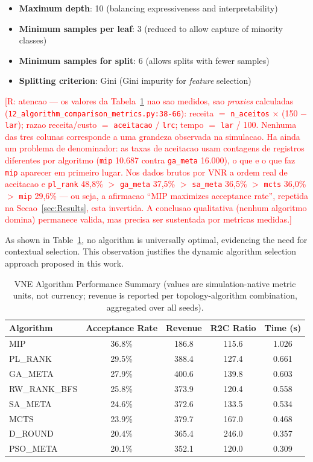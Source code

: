 \documentclass[runningheads]{llncs}
\begin{document}
\begin{itemize}
    \item \textbf{Maximum depth}: 10 (balancing expressiveness and interpretability)
    \item \textbf{Minimum samples per leaf}: 3 (reduced to allow capture of minority classes)
    \item \textbf{Minimum samples for split}: 6 (allows splits with fewer samples)
    \item \textbf{Splitting criterion}: Gini (Gini impurity for \textit{feature} selection)
\end{itemize}

\textcolor{red}{[R: atencao --- os valores da Tabela~\ref{tab:algorithm-summary} nao sao medidos, sao \emph{proxies} calculadas (\texttt{12\_algorithm\_comparison\_metrics.py:38-66}): receita $=$ \texttt{n\_aceitos} $\times$ (150 $-$ \texttt{lar}); razao receita/custo $=$ \texttt{aceitacao} / \texttt{lrc}; tempo $=$ \texttt{lar} / 100. Nenhuma das tres colunas corresponde a uma grandeza observada na simulacao. Ha ainda um problema de denominador: as taxas de aceitacao usam contagens de registros diferentes por algoritmo (\texttt{mip} 10.687 contra \texttt{ga\_meta} 16.000), o que e o que faz \texttt{mip} aparecer em primeiro lugar. Nos dados brutos por VNR a ordem real de aceitacao e \texttt{pl\_rank} 48,8\% $>$ \texttt{ga\_meta} 37,5\% $>$ \texttt{sa\_meta} 36,5\% $>$ \texttt{mcts} 36,0\% $>$ \texttt{mip} 29,6\% --- ou seja, a afirmacao ``MIP maximizes acceptance rate'', repetida na Secao~\ref{sec:Results}, esta invertida. A conclusao qualitativa (nenhum algoritmo domina) permanece valida, mas precisa ser sustentada por metricas medidas.]}

As shown in Table~\ref{tab:algorithm-summary}, no algorithm is universally optimal, evidencing the need for contextual selection. This observation justifies the dynamic algorithm selection approach proposed in this work.

\begin{table}[htbp]
\centering
\caption{VNE Algorithm Performance Summary (values are simulation-native metric units, not currency; revenue is reported per topology-algorithm combination, aggregated over all seeds).}
\label{tab:algorithm-summary}
\begin{tabular}{lcccc}
\toprule
\textbf{Algorithm} & \textbf{Acceptance Rate} & \textbf{Revenue} & \textbf{R2C Ratio} & \textbf{Time (s)} \\
\midrule
MIP & 36.8\% & 186.8 & 115.6 & 1.026 \\
PL\_RANK & 29.5\% & 388.4 & 127.4 & 0.661 \\
GA\_META & 27.9\% & 400.6 & 139.8 & 0.603 \\
RW\_RANK\_BFS & 25.8\% & 373.9 & 120.4 & 0.558 \\
SA\_META & 24.6\% & 372.6 & 133.5 & 0.534 \\
MCTS & 23.9\% & 379.7 & 167.0 & 0.468 \\
D\_ROUND & 20.4\% & 365.4 & 246.0 & 0.357 \\
PSO\_META & 20.1\% & 352.1 & 120.0 & 0.309 \\
\bottomrule
\end{tabular}
\end{table}
\end{document}
